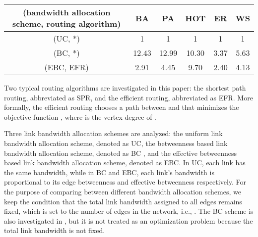 \documentclass[journal]{IEEEtran}
\begin{document}
{\begin{table*}[!t]
\begin{tabular}{c|ccccc}
(bandwidth allocation scheme, routing algorithm) & BA & PA & HOT &
ER & WS \\
\hline \hline

(UC, *)   & 1     & 1     & 1     & 1     & 1 \\
(BC, *)   & 12.43 & 12.99 & 10.30 & 3.37  & 5.63\\
(EBC, EFR)& 2.91  & 4.45  & 9.70  & 2.40  & 4.13\\

 \hline
\end{tabular}
\end{table*}

Two typical routing algorithms are investigated in this paper: the
shortest path routing, abbreviated as SPR, and the efficient
routing\cite{efficient-routing}, abbreviated as EFR. More formally,
the efficient routing chooses a path 
between  and  that minimizes the objective function
, where  is the vertex degree of
.

Three link bandwidth allocation schemes are analyzed: the uniform
link bandwidth allocation scheme, denoted as UC, the betweenness
based link bandwidth allocation scheme, denoted as BC , and the
effective betweenness based link bandwidth allocation scheme,
denoted as EBC. In UC, each link has the same bandwidth, while in BC
and EBC, each link's bandwidth is proportional to its edge
betweenness and effective betweenness respectively. For the purpose
of comparing between different bandwidth allocation schemes, we keep
the condition that the total link bandwidth assigned to all edges
remains fixed, which is set to the number of edges in the network,
i.e., . The BC scheme is also investigated in
\cite{onset-traffic-congestion}, but it is not treated as an
optimization problem because the total link bandwidth is not fixed.

}
\end{document}

